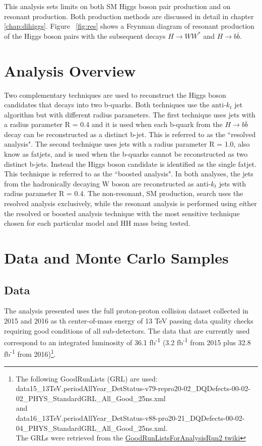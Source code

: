 \indent This analysis sets limits on both SM Higgs boson pair production and on resonant production. Both production methods are discussed in detail in chapter \ref{chap:dihiggs}. Figure ~\ref{fig:res} shows a Feynman diagram of resonant production of the Higgs boson pairs with the subsequent decays ${H\rightarrow WW^{*}}$ and ${H\rightarrow b\overline{b}}$.

\section{Analysis Overview}
Two complementary techniques are used to reconstruct the Higgs boson candidates that decays into two b-quarks. Both techniques use the ${\textrm{anti-}k_{t}}$ jet algorithm but with different radius parameters. The first technique uses jets with a radius parameter R = 0.4 and it is used when each b-quark from the ${H\rightarrow b\overline{b}}$ decay can be reconstructed as a distinct b-jet. This is referred to as the ``resolved analysis". The second technique uses jets with a radius parameter R = 1.0, also know as fatjets, and is used when the b-quarks cannot be reconstructed as two distinct b-jets. Instead the Higgs boson candidate is identified as the single fatjet. This technique is referred to as the ``boosted analysis". In both analyses, the jets from the hadronically decaying W boson are reconstructed as ${\textrm{anti-}k_{t}}$ jets with radius parameter R = 0.4. The non-resonant, SM production, search uses the resolved analysis exclusively, while the resonant analysis is performed using either the resolved or boosted analysis technique with the most sensitive technique chosen for each particular model and HH mass being tested.
\section{Data and Monte Carlo Samples}
\subsection{Data}
\indent The analysis presented uses the full proton-proton collision dataset collected in 2015 and 2016 as th center-of-mass energy of 13 TeV passing data quality checks requiring good conditions of all sub-detectors. The data that are currently used correspond to an integrated luminosity of 36.1 fb\textsuperscript{-1} (3.2 fb\textsuperscript{-1} from 2015 plus 32.8 fb\textsuperscript{-1} from 2016)\footnote{The following GoodRunLists (GRL) are used:\\  
data15\_13TeV.periodAllYear\_DetStatus-v79-repro20-02\_DQDefects-00-02-02\_PHYS\_StandardGRL\_All\_Good\_25ns.xml\\
and\\
data16\_13TeV.periodAllYear\_DetStatus-v88-pro20-21\_DQDefects-00-02-04\_PHYS\_StandardGRL\_All\_Good\_25ns.xml.\\
The GRLs were retrieved from the \href{https://twiki.cern.ch/twiki/bin/view/AtlasProtected/GoodRunListsForAnalysisRun2}{GoodRunListsForAnalysisRun2 twiki}}.

